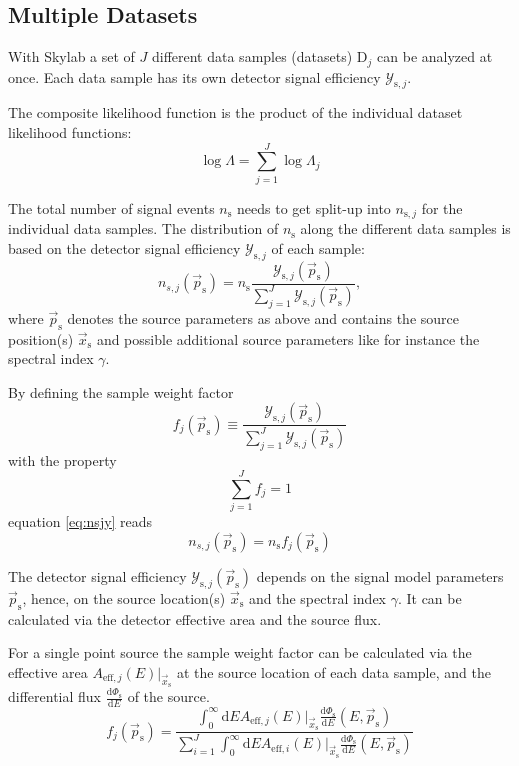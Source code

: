 \documentclass{article}
\newcommand{\ns}{n_{\mathrm{s}}}
\newcommand{\ps}{\vec{p}_{\mathrm{s}}}
\newcommand{\xs}{\vec{x}_{\mathrm{s}}}
\newcommand{\dPhisdE}{\frac{\mathrm{d}\Phi_{\mathrm{s}}}{\mathrm{d}E}}
\begin{document}
\subsection{Multiple Datasets}

With Skylab a set of $J$ different data samples (datasets) $\mathrm{D}_j$ can be
analyzed at once. Each data sample has its own detector signal efficiency
$\mathcal{Y}_{\mathrm{s},j}$.

The composite likelihood function is the product of the individual dataset
likelihood functions:
\begin{equation}
 \log \Lambda = \sum_{j=1}^{J} \log \Lambda_j
 \label{eq:logLambdaComposite}
\end{equation}

The total number of signal events $\ns$ needs to get split-up into
$n_{\mathrm{s},j}$ for the individual data samples. The distribution of $\ns$
along the different data samples is based on the detector signal efficiency
$\mathcal{Y}_{\mathrm{s},j}$ of each sample:
\begin{equation}
 n_{s,j}(\ps) = \ns \frac{\mathcal{Y}_{\mathrm{s},j}(\ps)}{\sum_{j=1}^{J} \mathcal{Y}_{\mathrm{s},j}(\ps)},
 \label{eq:nsjy}
\end{equation}
where $\ps$ denotes the source parameters as above and contains the source
position(s) $\xs$ and possible additional source parameters like
for instance the spectral index $\gamma$.

By defining the sample weight factor
\begin{equation}
 f_j(\ps) \equiv \frac{\mathcal{Y}_{\mathrm{s},j}(\ps)}{\sum_{j=1}^{J} \mathcal{Y}_{\mathrm{s},j}(\ps)}
\end{equation}
with the property
\begin{equation}
 \sum_{j=1}^{J} f_j = 1
\end{equation}
equation \ref{eq:nsjy} reads
\begin{equation}
 n_{s,j}(\ps) = \ns f_{j}(\ps)
 \label{eq:ns-sample-weight-factor}
\end{equation}

The detector signal efficiency $\mathcal{Y}_{\mathrm{s},j}(\ps)$
depends on the signal model parameters $\ps$, hence, on the source location(s) $\xs$
and the spectral index $\gamma$. It can be calculated via the detector effective
area and the source flux.

For a single point source the sample weight factor can be calculated via the effective area
$A_{\mathrm{eff},j}(E)|_{\xs}$ at the source location of each data sample, and the
differential flux $\dPhisdE$ of the source.
\begin{equation}
 f_{j}(\ps) = \frac{\int_0^\infty \mathrm{d}E A_{\mathrm{eff},j}(E)|_{\xs} \dPhisdE(E,\ps)}
	           {\sum_{i=1}^{J} \int_0^\infty \mathrm{d}E A_{\mathrm{eff},i}(E)|_{\xs} \dPhisdE(E,\ps)}
 \label{eq:fj}
\end{equation}
\end{document}
